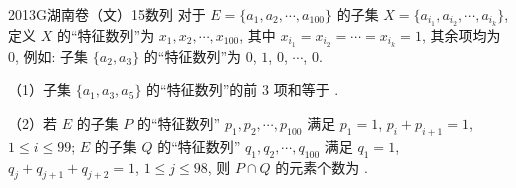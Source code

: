 
\begin{problem}{2013}{G}{湖南卷（文）}{15}{数列}
对于 $ E=\{a_1,a_2,\cdots,a_{100}\} $ 的子集 $ X=\{a_{i_1},a_{i_2},\cdots,a_{i_k}\} $, 定义 $ X $ 的“特征数列”为 $ x_1,x_2,\cdots,x_{100} $, 其中 $ x_{i_1}=x_{i_2}=\cdots=x_{i_k}=1 $, 其余项均为 $ 0 $, 例如: 子集 $ \{a_2,a_3\} $ 的“特征数列”为 $ 0 $, $ 1 $, $ 0 $, $ \cdots $, $ 0 $.

（1）子集 $ \{a_1,a_3,a_5\} $ 的“特征数列”的前 $ 3 $ 项和等于 \underline{\hspace{4em}}.

（2）若 $ E $ 的子集 $ P $ 的“特征数列” $ p_1,p_2,\cdots,p_{100} $ 满足 $ p_1=1 $, $ p_i+p_{i+1}=1 $, $ 1\leq i\leq 99 $; $ E $ 的子集 $ Q $ 的“特征数列” $ q_1,q_2,\cdots,q_{100} $ 满足 $ q_1=1 $, $ q_j+q_{j+1}+q_{j+2}=1 $, $ 1\leq j\leq 98 $, 则 $ P\cap Q $ 的元素个数为 \underline{\hspace{4em}}.
\end{problem}

\begin{answer}

\end{answer}

\begin{solutions}

\end{solutions}